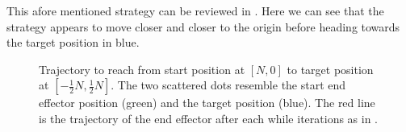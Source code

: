 This afore mentioned strategy can be reviewed in . Here we can see that the strategy appears to move closer and closer to the origin before heading towards the target position in blue.
\begin{figure}
    \begin{center}
        \hfill
		\hfill
    \end{center}
    \caption[CCD trajectory]{Trajectory to reach from start position at $[N, 0]$ to target position at $[-\frac{1}{2}N, \frac{1}{2}N]$. The two scattered dots resemble the start end effector position (green) and the target position (blue). The red line is the trajectory of the end effector after each while iterations as in . }
    \label{fig:ccd_trajectory}
\end{figure}

